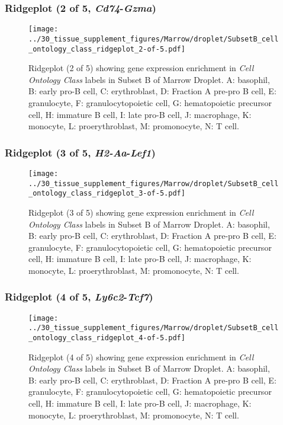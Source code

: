 \clearpage

\subsubsection{Ridgeplot (2 of 5, \emph{Cd74}-\emph{Gzma})}
\begin{figure}[h]
\centering
\texttt{[image: ../30\_tissue\_supplement\_figures/Marrow/droplet/SubsetB\_cell\_ontology\_class\_ridgeplot\_2-of-5.pdf]}

\caption{ Ridgeplot (2 of 5)  showing gene expression enrichment in \emph{Cell Ontology Class} labels in Subset B of Marrow Droplet. A: basophil, B: early pro-B cell, C: erythroblast, D: Fraction A pre-pro B cell, E: granulocyte, F: granulocytopoietic cell, G: hematopoietic precursor cell, H: immature B cell, I: late pro-B cell, J: macrophage, K: monocyte, L: proerythroblast, M: promonocyte, N: T cell.}
\end{figure}


\clearpage

\subsubsection{Ridgeplot (3 of 5, \emph{H2-Aa}-\emph{Lef1})}
\begin{figure}[h]
\centering
\texttt{[image: ../30\_tissue\_supplement\_figures/Marrow/droplet/SubsetB\_cell\_ontology\_class\_ridgeplot\_3-of-5.pdf]}

\caption{ Ridgeplot (3 of 5)  showing gene expression enrichment in \emph{Cell Ontology Class} labels in Subset B of Marrow Droplet. A: basophil, B: early pro-B cell, C: erythroblast, D: Fraction A pre-pro B cell, E: granulocyte, F: granulocytopoietic cell, G: hematopoietic precursor cell, H: immature B cell, I: late pro-B cell, J: macrophage, K: monocyte, L: proerythroblast, M: promonocyte, N: T cell.}
\end{figure}


\clearpage

\subsubsection{Ridgeplot (4 of 5, \emph{Ly6c2}-\emph{Tcf7})}
\begin{figure}[h]
\centering
\texttt{[image: ../30\_tissue\_supplement\_figures/Marrow/droplet/SubsetB\_cell\_ontology\_class\_ridgeplot\_4-of-5.pdf]}

\caption{ Ridgeplot (4 of 5)  showing gene expression enrichment in \emph{Cell Ontology Class} labels in Subset B of Marrow Droplet. A: basophil, B: early pro-B cell, C: erythroblast, D: Fraction A pre-pro B cell, E: granulocyte, F: granulocytopoietic cell, G: hematopoietic precursor cell, H: immature B cell, I: late pro-B cell, J: macrophage, K: monocyte, L: proerythroblast, M: promonocyte, N: T cell.}
\end{figure}


